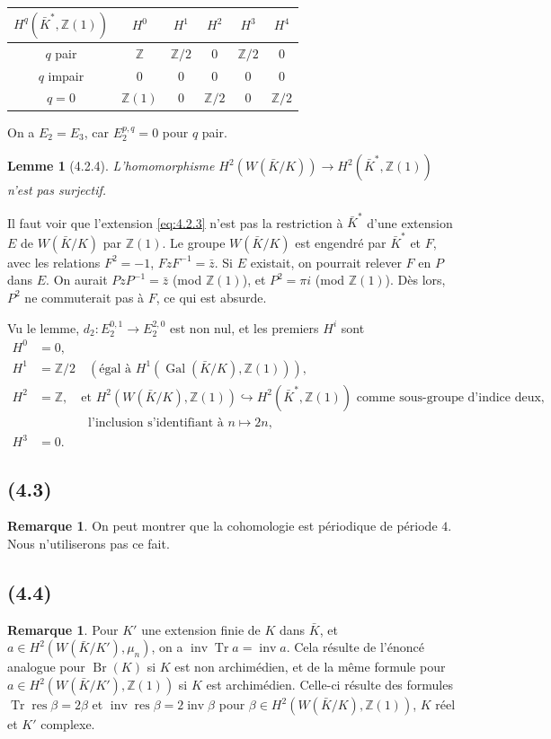 \documentclass[11pt]{amsart}
\theoremstyle{plain}
\newtheorem{lemme}[theoreme]{Lemme}
\theoremstyle{definition}
\newtheorem{remarque}[theoreme]{Remarque}
\DeclareMathOperator{\Gal}{Gal}
\DeclareMathOperator{\Tr}{Tr}
\DeclareMathOperator{\inv}{inv}
\DeclareMathOperator{\Br}{Br}
\DeclareMathOperator{\res}{res}
\newcommand{\Z}{\mathbb{Z}}
\begin{document}
\begin{center}
\begin{tabular}{c|ccccc}
$H^q(\bar K^*,\Z(1))$ & $H^0$ & $H^1$ & $H^2$ & $H^3$ & $H^4$ \\
\hline
$q$ pair & $\Z$ & $\Z/2$ & $0$ & $\Z/2$ & $0$ \\
$q$ impair & $0$ & $0$ & $0$ & $0$ & $0$ \\
$q=0$ & $\Z(1)$ & $0$ & $\Z/2$ & $0$ & $\Z/2$
\end{tabular}
\end{center}

On a $E_2=E_3$, car $E_2^{p,q}=0$ pour $q$ pair.

\begin{lemme}[4.2.4]\label{lem:4.2.4}
L'homomorphisme $H^2(W(\bar K/K))\to H^2(\bar K^*,\Z(1))$ n'est pas surjectif.
\end{lemme}

Il faut voir que l'extension \eqref{eq:4.2.3} n'est pas la restriction \`a $\bar K^*$ d'une extension $E$ de $W(\bar K/K)$ par $\Z(1)$. Le groupe $W(\bar K/K)$ est engendr\'e par $\bar K^*$ et $F$, avec les relations $F^2=-1$, $FzF^{-1}=\bar{z}$. Si $E$ existait, on pourrait relever $F$ en $P$ dans $E$. On aurait $PzP^{-1}=\bar{z}$ (mod $\Z(1)$), et $P^2=\pi i$ (mod $\Z(1)$). D\`es lors, $P^2$ ne commuterait pas \`a $F$, ce qui est absurde.

Vu le lemme, $d_2\colon E_2^{0,1}\to E_2^{2,0}$ est non nul, et les premiers $H^i$ sont
\begin{align*}
H^0&=0, \\
H^1&=\Z/2\quad(\text{\'egal \`a }H^1(\Gal(\bar K/K),\Z(1))), \\
H^2&=\Z,\quad\text{et }H^2(W(\bar K/K),\Z(1))\hookrightarrow H^2(\bar K^*,\Z(1))\text{ comme sous-groupe d'indice deux,}\\
&\qquad\qquad\text{l'inclusion s'identifiant \`a }n\mapsto 2n, \\
H^3&=0.
\end{align*}

\subsection{(4.3)}
\begin{remarque}
On peut montrer que la cohomologie est p\'eriodique de p\'eriode $4$. Nous n'utiliserons pas ce fait.
\end{remarque}

\subsection{(4.4)}
\begin{remarque}
Pour $K'$ une extension finie de $K$ dans $\bar K$, et $a\in H^2(W(\bar K/K'),\mu_n)$, on a $\inv\Tr a=\inv a$. Cela r\'esulte de l'\'enonc\'e analogue pour $\Br(K)$ si $K$ est non archim\'edien, et de la m\^eme formule pour $a\in H^2(W(\bar K/K'),\Z(1))$ si $K$ est archim\'edien. Celle-ci r\'esulte des formules $\Tr\res\beta=2\beta$ et $\inv\res\beta=2\inv\beta$ pour $\beta\in H^2(W(\bar K/K),\Z(1))$, $K$ r\'eel et $K'$ complexe.
\end{remarque}
\end{document}
